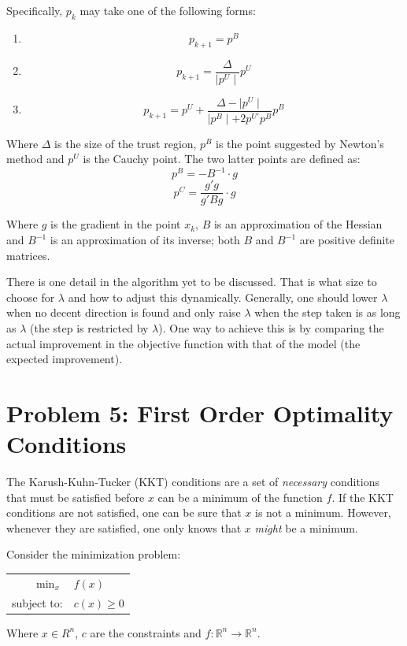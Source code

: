 \documentclass[10pt,oneside,a4paper,final,english]{memoir}
\begin{document}
Specifically, $p_k$ may take one of the following forms:
\begin{enumerate}
\item \[ p_{k+1} = p^B \]
\item \[ p_{k+1} = \frac{\Delta}{\mid p^U\mid}  p^U \]
\item \[ p_{k+1} = p^U + \frac{\Delta - \mid p^U\mid}{
    \mid p^B\mid + 2p^{U\prime} p^B} p^B \]
\end{enumerate}


Where $\Delta$ is the size of the trust region, $p^B$ is the point
suggested by Newton's method and $p^U$ is the Cauchy point. The two
latter points are defined as:
\[ p^B = -B^{-1} \cdot g \]
\[ p^C = \frac{g' g}{g'Bg} \cdot g \]

Where $g$ is the gradient in the point $x_k$, $B$ is an approximation
of the Hessian and $B^{-1}$ is an approximation of its inverse; both
$B$ and $B^{-1}$ are positive definite matrices.

There is one detail in the algorithm yet to be discussed. That is what
size to choose for $\lambda$ and how to adjust this
dynamically. Generally, one should lower $\lambda$ when no decent
direction is found and only raise $\lambda$ when the step taken is as
long as $\lambda$ (the step is restricted by $\lambda$). One way to
achieve this is by comparing the actual improvement in the objective
function with that of the model (the expected improvement).


\section{Problem 5: First Order Optimality Conditions}
The Karush-Kuhn-Tucker (KKT) conditions are a set of \textit{necessary}
conditions that must be satisfied before $x$ can be a minimum of
the function $f$. If the KKT conditions are not satisfied, one can
be sure that $x$ is not a minimum. However, whenever they are
satisfied, one only knows that $x$ \textit{might} be a minimum.

Consider the minimization problem:\\
\begin{center}\begin{tabular}{rl}
$\min_{x}$ & $f(x)$ \\
subject to: & $c(x) \geq 0$
\end{tabular}\end{center}

Where $x \in R^n$, $c$ are the constraints and $f : \mathbb{R}^n
\to \mathbb{R}^n$.
\end{document}
